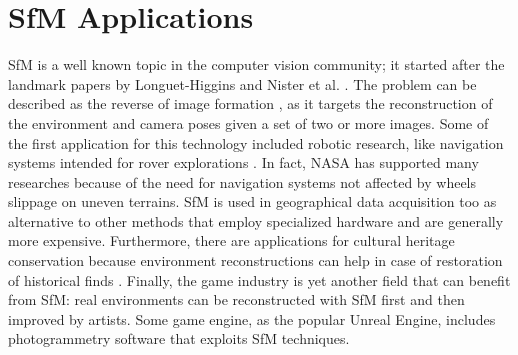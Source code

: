 \section{SfM Applications}
SfM is a well known topic in the computer vision community; it started after 
the landmark papers by Longuet-Higgins \cite{longuet1981computer} and
Nister et al. \cite{moravec1980obstacle}.
The problem can be described as the reverse of image formation
\cite{Wei2013}, as it targets the reconstruction of the environment 
and camera poses given a set of two or more images.
Some of the first application for this technology included robotic research, 
like navigation systems intended for rover explorations 
\cite{moravec1980obstacle,durrant1996localization}. In fact, NASA has supported
many researches because of the need for navigation systems not affected by wheels
slippage on uneven terrains.
SfM is used in geographical data acquisition too
\cite{fonstad2013topographic, westoby2012structure, james2012straightforward}
as alternative to other methods that employ specialized hardware and are generally more expensive.
Furthermore, there are applications for cultural heritage conservation because 
environment reconstructions can help in case of restoration of historical finds
\cite{kraus2007photogrammetry}.
Finally, the game industry is yet another field that can benefit from 
SfM: real environments can be reconstructed with SfM first and then 
improved by artists. Some game engine, as the popular Unreal Engine\registered,
includes photogrammetry software that exploits SfM techniques. 
